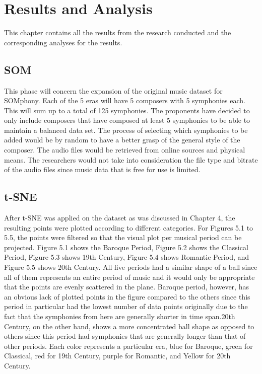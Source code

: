 %
%
%                 

\chapter{Results and Analysis}
This chapter contains all the results from the research conducted and the corresponding analyses for the results.

\section{SOM}

This phase will concern the  expansion of the original music dataset for SOMphony. Each of the 5 eras will have 5 composers with 5 symphonies each. This will sum up to a total of 125 symphonies. The proponents have decided to only include composers that have composed at least 5 symphonies to be able to maintain a balanced data set. The process of selecting which symphonies to be added would be by random to have a better grasp of the general style of the composer. The audio files would be retrieved from online sources and physical means. The researchers would not take into consideration the file type and bitrate of the audio files since music data that is free for use is limited.

\section{t-SNE}
After t-SNE was applied on the dataset as was discussed in Chapter 4, the resulting points were plotted according to different categories. For Figures 5.1 to 5.5, the points were filtered so that the visual plot per musical period can be projected. Figure 5.1 shows the Baroque Period, Figure 5.2 shows the Classical Period, Figure 5.3 shows 19th Century, Figure 5.4 shows Romantic Period, and Figure 5.5 shows 20th Century. All five periods had a similar shape of a ball since all of them represents an entire period of music and it would only be appropriate that the points are evenly scattered in the plane. Baroque period, however, has an obvious lack of plotted points in the figure compared to the others since this period in particular had the lowest number of data points originally due to the fact that the symphonies from here are generally shorter in time span.20th Century, on the other hand, shows a more concentrated ball shape as opposed to others since this period had symphonies that are generally longer than that of other periods. Each color represents a particular era, blue for Baroque, green for Classical, red for 19th Century, purple for Romantic, and Yellow for 20th Century.

